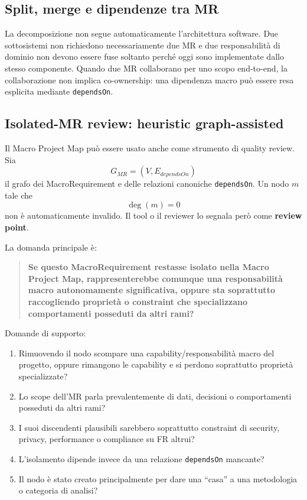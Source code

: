 \documentclass[12pt,a4paper,oneside]{report}
\begin{document}
\subsection{Split, merge e dipendenze tra MR}

La decomposizione non segue automaticamente l'architettura software. Due sottosistemi non richiedono necessariamente due MR e due responsabilità di dominio non devono essere fuse soltanto perché oggi sono implementate dallo stesso componente. Quando due MR collaborano per uno scopo end-to-end, la collaborazione non implica co-ownership: una dipendenza macro può essere resa esplicita mediante \texttt{dependsOn}.

\subsection{Isolated-MR review: heuristic graph-assisted}

Il Macro Project Map può essere usato anche come strumento di quality review. Sia
\[
G_{MR}=(V,E_{dependsOn})
\]
il grafo dei MacroRequirement e delle relazioni canoniche \texttt{dependsOn}. Un nodo $m$ tale che
\[
\deg(m)=0
\]
non è automaticamente invalido. Il tool o il reviewer lo segnala però come \textbf{review point}.

La domanda principale è:
\begin{quote}
\textbf{Se questo MacroRequirement restasse isolato nella Macro Project Map, rappresenterebbe comunque una responsabilità macro autonomamente significativa, oppure sta soprattutto raccogliendo proprietà o constraint che specializzano comportamenti posseduti da altri rami?}
\end{quote}

Domande di supporto:
\begin{enumerate}
  \item Rimuovendo il nodo scompare una capability/responsabilità macro del progetto, oppure rimangono le capability e si perdono soprattutto proprietà specializzate?
  \item Lo scope dell'MR parla prevalentemente di dati, decisioni o comportamenti posseduti da altri rami?
  \item I suoi discendenti plausibili sarebbero soprattutto constraint di security, privacy, performance o compliance su FR altrui?
  \item L'isolamento dipende invece da una relazione \texttt{dependsOn} mancante?
  \item Il nodo è stato creato principalmente per dare una ``casa'' a una metodologia o categoria di analisi?
\end{enumerate}
\end{document}
